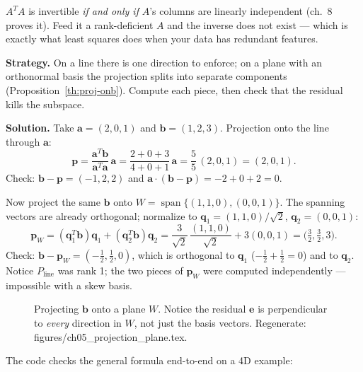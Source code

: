 \begin{tripwire}
$A^{T}A$ is invertible \emph{if and only if} $A$'s columns are linearly
independent (ch.~8 proves it). Feed it a rank-deficient $A$ and the
inverse does not exist --- which is exactly what least squares does when
your data has redundant features.
\end{tripwire}

\begin{example}\label{ex:proj}
\textbf{Strategy.} On a line there is one direction to enforce; on a plane
with an orthonormal basis the projection splits into separate components
(Proposition~\ref{th:proj-onb}). Compute each piece, then check that the
residual kills the subspace.

\textbf{Solution.} Take $\mathbf a=(2,0,1)$ and $\mathbf b=(1,2,3)$.
Projection onto the line through $\mathbf a$:
\[
\mathbf p=\frac{\mathbf a^{T}\mathbf b}{\mathbf a^{T}\mathbf a}\,\mathbf a
=\frac{2+0+3}{4+0+1}\,\mathbf a=\frac55\,(2,0,1)=(2,0,1).
\]
Check: $\mathbf b-\mathbf p=(-1,2,2)$ and
$\mathbf a\cdot(\mathbf b-\mathbf p)=-2+0+2=0$. \checkmark

Now project the same $\mathbf b$ onto
$W=\operatorname{span}\{(1,1,0),(0,0,1)\}$. The spanning vectors are already
orthogonal; normalize to $\mathbf q_1=(1,1,0)/\sqrt2$, $\mathbf q_2=(0,0,1)$:
\[
\mathbf p_W=(\mathbf q_1^{T}\mathbf b)\mathbf q_1+(\mathbf q_2^{T}\mathbf b)\mathbf q_2
=\frac{3}{\sqrt2}\,\frac{(1,1,0)}{\sqrt2}+3(0,0,1)
=\bigl(\tfrac32,\tfrac32,3\bigr).
\]
Check: $\mathbf b-\mathbf p_W=(-\tfrac12,\tfrac12,0)$, which is orthogonal to
$\mathbf q_1$ ($-\tfrac12+\tfrac12=0$) and to $\mathbf q_2$. \checkmark
Notice $P_{\text{line}}$ was rank 1; the two pieces of $\mathbf p_W$ were
computed independently --- impossible with a skew basis.
\end{example}

\begin{figure}[htbp]
\centering

\caption{Projecting $\mathbf b$ onto a plane $W$. Notice the residual
$\mathbf e$ is perpendicular to \emph{every} direction in $W$, not just the
basis vectors. Regenerate: \ttfamily figures/ch05\_projection\_plane.tex.}
\label{fig:proj-plane}
\end{figure}

The code checks the general formula end-to-end on a 4D example:

